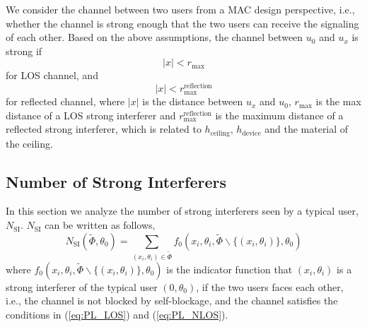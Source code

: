 \documentclass[10pt, conference, letterpaper]{IEEEtran}
\begin{document}
We consider the channel between two users from a MAC design perspective, i.e., whether the channel is strong enough that the two users can receive the signaling of each other.
Based on the above assumptions, the channel between $u_0$ and $u_x$ is strong if  
\begin{equation}\label{eq:PL_LOS}
|x| < r_{\max}
\end{equation}
for LOS channel, and 
\begin{equation}\label{eq:PL_NLOS}
|x| < r_{\max}^{\mathrm{reflection}}
\end{equation}
for reflected channel, where $|x|$ is the distance between $u_x$ and $u_0$, $r_{\max}$ is the max distance of a LOS strong interferer and $r_{\max}^{\mathrm{reflection}}$ is the maximum distance of a reflected strong interferer, which is related to $h_{\mathrm{ceiling}}$, $h_{\mathrm{device}}$ and the material of the ceiling. 

\subsection{Number of Strong Interferers}
In this section we analyze the number of strong interferers seen by a typical user, $N_{\mathrm{SI}}$. 
$N_{\mathrm{SI}}$ can be written as follows, 
\begin{equation}
N_{\mathrm{SI}}(\tilde{\Phi}, \theta_0) = \sum_{(x_i, \theta_i)\in \tilde{\Phi}}f_0(x_i, \theta_i, \tilde{\Phi}\backslash\{(x_i,\theta_i)\}, \theta_0)
\end{equation}
where $f_0(x_i, \theta_i, \tilde{\Phi}\backslash\{(x_i,\theta_i)\}, \theta_0)$ is the indicator function that $(x_i, \theta_i)$ is a strong interferer of the typical user $(0,\theta_0)$, if the two users faces each other, i.e., the channel is not blocked by self-blockage, and the channel satisfies the conditions in (\ref{eq:PL_LOS}) and (\ref{eq:PL_NLOS}).
\end{document}
